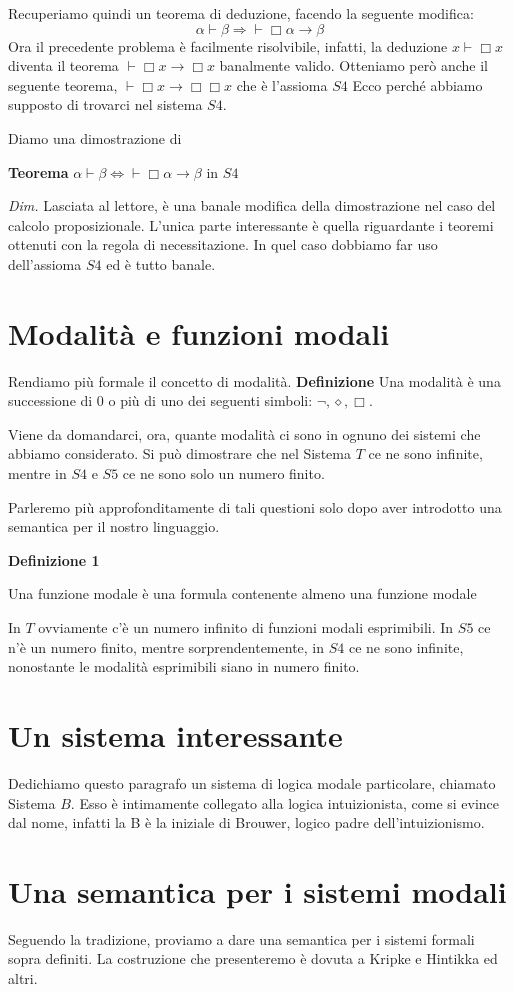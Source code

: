 \documentclass[a4paper, 12pt]{article}
\begin{document}
Recuperiamo quindi un teorema di deduzione, facendo la seguente modifica:
$$\alpha \vdash \beta \Rightarrow \vdash \Box \alpha \rightarrow \beta$$
Ora il precedente problema è facilmente risolvibile, infatti, la deduzione $x \vdash \Box x$
diventa il teorema $\vdash \Box x \rightarrow \Box x$ banalmente valido.
Otteniamo però anche il seguente teorema, $\vdash \Box x \rightarrow \Box \Box x$ che è l'assioma $S4$
Ecco perché abbiamo supposto di trovarci nel sistema $S4$.

Diamo una dimostrazione di

\begin{flushleft}
\textbf{Teorema}
$\alpha \vdash \beta \Leftrightarrow \vdash \Box \alpha \rightarrow \beta$ in $S4$

\textit{Dim.}
Lasciata al lettore, è una banale modifica della dimostrazione nel caso del calcolo proposizionale.
L'unica parte interessante è quella riguardante i teoremi ottenuti con la regola di necessitazione.
In quel caso dobbiamo far uso dell'assioma $S4$ ed è tutto banale.
\end{flushleft}



\section{Modalità e funzioni modali}
Rendiamo più formale il concetto di modalità.
\textbf{Definizione}
Una modalità è una successione di 0 o più di uno dei seguenti simboli: $\neg,\diamond,\Box$.

Viene da domandarci, ora, quante modalità ci sono in ognuno dei sistemi che abbiamo considerato.
Si può dimostrare che nel Sistema $T$ ce ne sono infinite,
mentre in $S4$ e $S5$ ce ne sono solo un numero finito.

Parleremo più approfonditamente di tali questioni solo dopo aver introdotto una semantica
per il nostro linguaggio.

\begin{flushleft}
\textbf{Definizione 1}

Una funzione modale è una formula contenente almeno una funzione modale
\end{flushleft}

In $T$ ovviamente c'è un numero infinito di funzioni modali esprimibili.
In $S5$ ce n'è un numero finito, mentre sorprendentemente,
in $S4$ ce ne sono infinite, nonostante le modalità esprimibili siano in numero finito.

\section{Un sistema interessante}
Dedichiamo questo paragrafo un sistema di logica modale particolare, chiamato Sistema $B$.
Esso è intimamente collegato alla logica intuizionista, come si evince dal nome,
infatti la B è la iniziale di Brouwer, logico padre dell'intuizionismo.

\section{Una semantica per i sistemi modali}
Seguendo la tradizione, proviamo a dare una semantica per i sistemi formali sopra definiti.
La costruzione che presenteremo è dovuta a Kripke e Hintikka ed altri.
\end{document}
